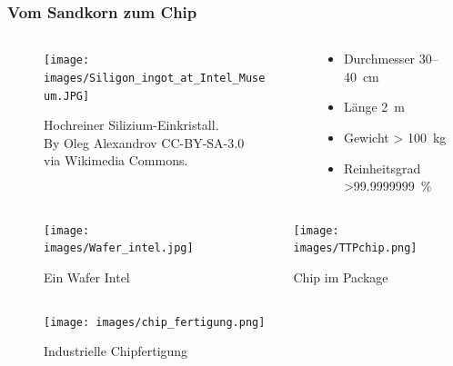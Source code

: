 \begin{frame}
	\frametitle{Vom Sandkorn zum Chip}
	\begin{columns}[onlytextwidth]
		\begin{column}{0.6\textwidth}
			\begin{figure}
				\centering
				\texttt{[image: images/Siligon\_ingot\_at\_Intel\_Museum.JPG]}

				\caption{Hochreiner Silizium-Einkristall.\\
					By Oleg Alexandrov CC-BY-SA-3.0\\
					via Wikimedia Commons.}
			\end{figure}
		\end{column}
		\begin{column}{0.45\textwidth}
			\begin{itemize}
				\item Durchmesser 30--\SI{40}{\centi\meter}
				\item Länge \SI{2}{\meter}
				\item Gewicht \SI{> 100}{\kilo\gram}
				\item Reinheitsgrad \SI{>99.9999999}{\percent}
			\end{itemize}
		\end{column}
	\end{columns}
\end{frame}

\begin{frame}
	\begin{columns}
		\begin{column}{.5\textwidth}
			\begin{figure}
				\centering
				\texttt{[image: images/Wafer\_intel.jpg]}
				\caption{Ein Wafer \textcopyright{} Intel}
			\end{figure}
		\end{column}
		\begin{column}{.5\textwidth}
			\begin{figure}
				\centering
				\texttt{[image: images/TTPchip.png]}
				\caption{Chip im Package}
			\end{figure}
		\end{column}
	\end{columns}
\end{frame}

\begin{frame}
	\begin{figure}
		\centering
		\texttt{[image: images/chip\_fertigung.png]}
		\vspace{0.3cm}
		\caption{Industrielle Chipfertigung}
	\end{figure}

\end{frame}


